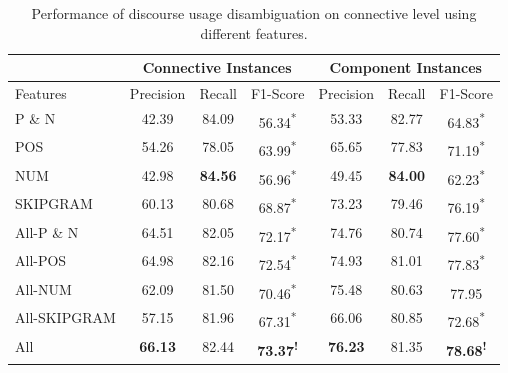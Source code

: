 \begin{table}[!htbp]
\centering
\begin{tabular}{|l|c|c|c|c|c|c|}
\hline
                & \multicolumn{3}{c|}{Connective Instances}                 & \multicolumn{3}{c|}{Component Instances}                      \\ \hline
Features        &     Precision &     Recall &     F1-Score                 &     Precision &     Recall &     F1-Score                     \\ \hline
P \& N          &     42.39     &     84.09  &     56.34\textsuperscript{*} &     53.33     &     82.77  &     64.83\textsuperscript{*}     \\ \hline
POS             &     54.26     &     78.05  &     63.99\textsuperscript{*} &     65.65     &     77.83  &     71.19\textsuperscript{*}     \\ \hline
NUM             &     42.98     & \bf 84.56  &     56.96\textsuperscript{*} &     49.45     & \bf 84.00  &     62.23\textsuperscript{*}     \\ \hline
SKIPGRAM        &     60.13     &     80.68  &     68.87\textsuperscript{*} &     73.23     &     79.46  &     76.19\textsuperscript{*}     \\ \hline
All-P \& N      &     64.51     &     82.05  &     72.17\textsuperscript{*} &     74.76     &     80.74  &     77.60\textsuperscript{*}     \\ \hline
All-POS         &     64.98     &     82.16  &     72.54\textsuperscript{*} &     74.93     &     81.01  &     77.83\textsuperscript{*}     \\ \hline
All-NUM         &     62.09     &     81.50  &     70.46\textsuperscript{*} &     75.48     &     80.63  &     77.95\textsuperscript{ }     \\ \hline
All-SKIPGRAM    &     57.15     &     81.96  &     67.31\textsuperscript{*} &     66.06     &     80.85  &     72.68\textsuperscript{*}     \\ \hline
All             & \bf 66.13     &     82.44  & \bf 73.37\textsuperscript{!} & \bf 76.23     &     81.35  & \bf 78.68\textsuperscript{!}     \\ \hline

\end{tabular}
\caption{\label{t:recognition-connective-features} Performance of discourse usage
disambiguation on connective level using different features. }
\end{table}
